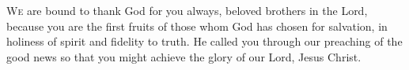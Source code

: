 
\lettrine{W}{e} are bound to thank God for you always, beloved brothers in the Lord, because you are the first fruits of those whom God has chosen for salvation, in holiness of spirit and fidelity to truth. He called you through our preaching of the good news so that you might achieve the glory of our Lord, Jesus Christ.